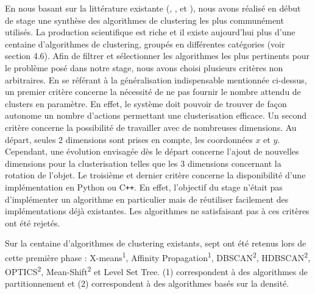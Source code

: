 \documentclass[draft]{llncs}
\begin{document}
En nous basant sur la littérature existante (\cite{Xu2015}, \cite{Andreopoulos2009}, \cite{Fahad2014} et \cite{Sajana2016}), nous avons réalisé en début de stage une synthèse des algorithmes de clustering les plus communément utilisés.
La production scientifique est riche et il existe aujourd'hui plus d'une centaine d'algorithmes de clustering, groupés en différentes catégories (voir section 4.6).
Afin de filtrer et sélectionner les algorithmes les plus pertinents pour le problème posé dans notre stage, nous avons choisi plusieurs critères non arbitraires.
En se référant à la généralisation indispensable mentionnée ci-dessus, un premier critère concerne la nécessité de ne pas fournir le nombre attendu de clusters en paramètre.
En effet, le système doit pouvoir de trouver de façon autonome un nombre d'actions permettant une clusterisation efficace.
Un second critère concerne la possibilité de travailler avec de nombreuses dimensions.
Au départ, seules 2 dimensions sont prises en compte, les coordonnées $x$ et $y$.
Cependant, une évolution envisagée dès le départ concerne l'ajout de nouvelles dimensions pour la clusterisation telles que les 3 dimensions concernant la rotation de l'objet.
Le troisième et dernier critère concerne la disponibilité d'une implémentation en Python ou C{}\verb!++!.
En effet, l'objectif du stage n'était pas d'implémenter un algorithme en particulier mais de réutiliser facilement des implémentations déjà existantes.
Les algorithmes ne satisfaisant pas à ces critères ont été rejetés.

Sur la centaine d'algorithmes de clustering existants, sept ont été retenus lors de cette première phase : X-means\textsuperscript{1}, Affinity Propagation\textsuperscript{1}, DBSCAN\textsuperscript{2}, HDBSCAN\textsuperscript{2}, OPTICS\textsuperscript{2}, Mean-Shift\textsuperscript{2} et Level Set Tree. (1) correspondent à des algorithmes de partitionnement et (2) correspondent à des algorithmes basés sur la densité.

\end{document}
